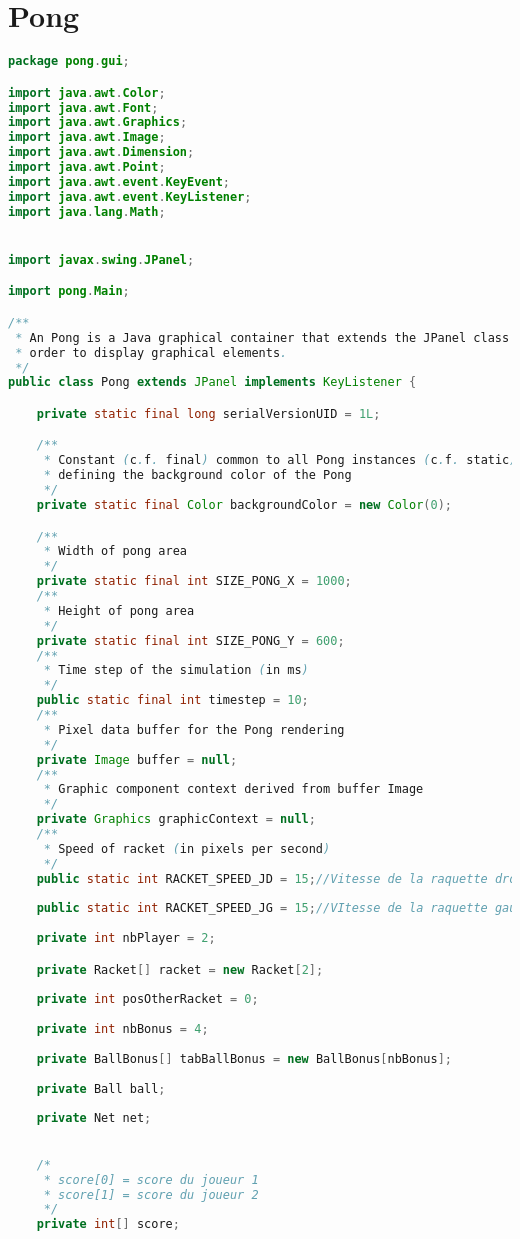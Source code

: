 \section{Pong}
\begin{lstlisting}[language=Java]
package pong.gui;

import java.awt.Color;
import java.awt.Font;
import java.awt.Graphics;
import java.awt.Image;
import java.awt.Dimension;
import java.awt.Point;
import java.awt.event.KeyEvent;
import java.awt.event.KeyListener;
import java.lang.Math;


import javax.swing.JPanel;

import pong.Main;

/**
 * An Pong is a Java graphical container that extends the JPanel class in
 * order to display graphical elements.
 */
public class Pong extends JPanel implements KeyListener {

	private static final long serialVersionUID = 1L;

	/**
	 * Constant (c.f. final) common to all Pong instances (c.f. static)
	 * defining the background color of the Pong
	 */
	private static final Color backgroundColor = new Color(0); 

	/**
	 * Width of pong area
	 */
	private static final int SIZE_PONG_X = 1000;
	/**
	 * Height of pong area
	 */
	private static final int SIZE_PONG_Y = 600;
	/**
	 * Time step of the simulation (in ms)
	 */
	public static final int timestep = 10;
	/**
	 * Pixel data buffer for the Pong rendering
	 */
	private Image buffer = null;
	/**
	 * Graphic component context derived from buffer Image
	 */
	private Graphics graphicContext = null;
	/**
	 * Speed of racket (in pixels per second)
	 */
	public static int RACKET_SPEED_JD = 15;//Vitesse de la raquette droite
	
	public static int RACKET_SPEED_JG = 15;//VItesse de la raquette gauche
	
	private int nbPlayer = 2;

	private Racket[] racket = new Racket[2];
	
	private int posOtherRacket = 0; 
	
	private int nbBonus = 4;
	
	private BallBonus[] tabBallBonus = new BallBonus[nbBonus];
	
	private Ball ball;	
	
	private Net net;

	
	/*
	 * score[0] = score du joueur 1
	 * score[1] = score du joueur 2
	 */
	private int[] score;
	

\end{lstlisting}
